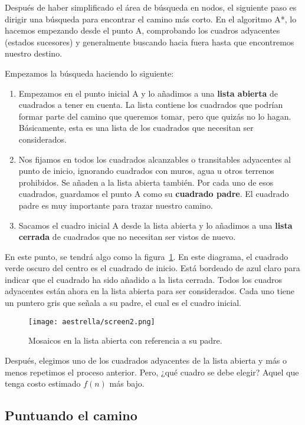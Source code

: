 Después de haber simplificado el área de búsqueda en nodos, el siguiente paso es dirigir una búsqueda para encontrar el camino más corto. En el algoritmo A*, lo hacemos empezando desde el punto A, comprobando los cuadros adyacentes (estados sucesores) y generalmente buscando hacia fuera hasta que encontremos nuestro destino.

\noindent Empezamos la búsqueda haciendo lo siguiente:

\begin{enumerate}
  \item Empezamos en el punto inicial A y lo añadimos a una \textbf{lista abierta} de cuadrados a tener en cuenta. La lista contiene los cuadrados que podrían formar parte del camino que queremos tomar, pero que quizás no lo hagan. Básicamente, esta es una lista de los cuadrados que necesitan ser considerados.
  \item Nos fijamos en todos los cuadrados alcanzables o transitables adyacentes al punto de inicio, ignorando cuadrados con muros, agua u otros terrenos prohibidos. Se añaden a la lista abierta también. Por cada uno de esos cuadrados, guardamos el punto A como su \textbf{cuadrado padre}. El cuadrado padre es muy importante para trazar nuestro camino.
  \item Sacamos el cuadro inicial A desde la lista abierta y lo añadimos a una \textbf{lista cerrada} de cuadrados que no necesitan ser vistos de nuevo.
\end{enumerate}

En este punto, se tendrá algo como la figura~\ref{fig:fig2P4}. En este diagrama, el cuadrado verde oscuro del centro es el cuadrado de inicio. Está bordeado de azul claro para indicar que el cuadrado ha sido añadido a la lista cerrada. Todos los cuadros adyacentes están ahora en la lista abierta para ser considerados. Cada uno tiene un puntero gris que señala a su padre, el cual es el cuadro inicial.

\begin{figure}[h]
  \centering
  \texttt{[image: aestrella/screen2.png]}
  \caption{Mosaicos en la lista abierta con referencia a su padre.}
  \label{fig:fig2P4}
\end{figure}


Después, elegimos uno de los cuadrados adyacentes de la lista abierta y más o menos repetimos el proceso anterior. Pero, ¿qué cuadro se debe elegir? Aquel que tenga costo estimado \(f(n)\) más bajo.

\subsection{Puntuando el camino}

